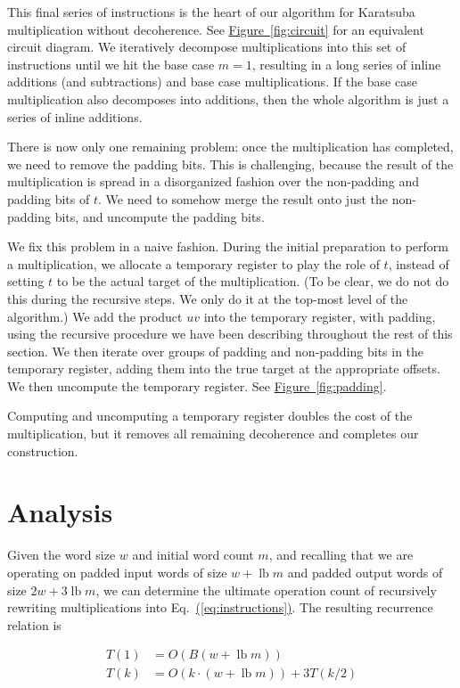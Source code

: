 \documentclass[onecolumn,unpublished]{quantumarticle}
\newcommand{\eq}[1]{Eq.~\hyperref[eq:#1]{(\ref*{eq:#1})}}
\newcommand{\fig}[1]{\hyperref[fig:#1]{Figure~\ref*{fig:#1}}}
\def\lb{\operatorname{lb}}
\begin{document}
This final series of instructions is the heart of our algorithm for Karatsuba multiplication without decoherence.
See \fig{circuit} for an equivalent circuit diagram.
We iteratively decompose multiplications into this set of instructions until we hit the base case $m=1$, resulting in a long series of inline additions (and subtractions) and base case multiplications.
If the base case multiplication also decomposes into additions, then the whole algorithm is just a series of inline additions.

There is now only one remaining problem: once the multiplication has completed, we need to remove the padding bits.
This is challenging, because the result of the multiplication is spread in a disorganized fashion over the non-padding and padding bits of $t$.
We need to somehow merge the result onto just the non-padding bits, and uncompute the padding bits.

We fix this problem in a naive fashion.
During the initial preparation to perform a multiplication, we allocate a temporary register to play the role of $t$, instead of setting $t$ to be the actual target of the multiplication.
(To be clear, we do not do this during the recursive steps.
We only do it at the top-most level of the algorithm.)
We add the product $uv$ into the temporary register, with padding, using the recursive procedure we have been describing throughout the rest of this section.
We then iterate over groups of padding and non-padding bits in the temporary register, adding them into the true target at the appropriate offsets.
We then uncompute the temporary register.
See \fig{padding}.

Computing and uncomputing a temporary register doubles the cost of the multiplication, but it removes all remaining decoherence and completes our construction.


\section{Analysis}
\label{sec:results}

Given the word size $w$ and initial word count $m$, and recalling that we are operating on padded input words of size $w + \lb m$ and padded output words of size $2w + 3 \lb m$, we can determine the ultimate operation count of recursively rewriting multiplications into \eq{instructions}.
The resulting recurrence relation is

\begin{equation}
    \begin{aligned}
        T(1) &= O(B(w + \lb m))
        \\
        T(k) &= O(k \cdot (w + \lb m)) + 3 T(k/2)
    \end{aligned}
\end{equation}
\end{document}
